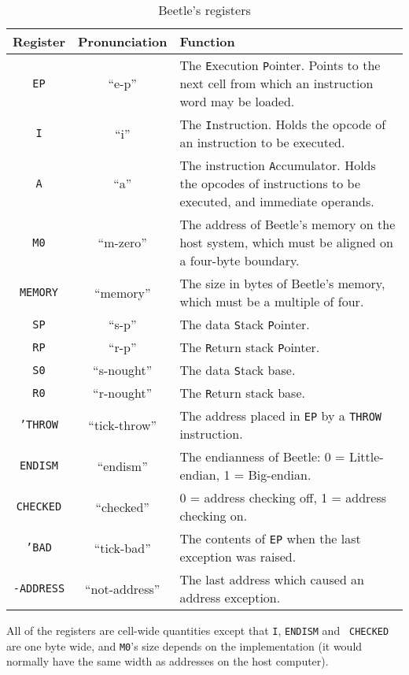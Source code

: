 \documentclass{article}
\begin{document}
\begin{table}[htbp]
\begin{center}
\begin{tabular}{ccp{3.75in}} \toprule
\bf Register & \bf Pronunciation & \bf Function \\
    \midrule
{\tt EP} & ``e-p'' & The {\tt E}xecution {\tt P}ointer. Points to the next
    cell from which an instruction word may be loaded. \\
{\tt I} & ``i'' & The {\tt I}nstruction. Holds the opcode of an instruction
    to be executed. \\
{\tt A} & ``a'' & The instruction {\tt A}ccumulator. Holds the opcodes of
    instructions to be executed, and immediate operands. \\
{\tt M0} & ``m-zero'' & The address of Beetle's memory on the host
    system, which must be aligned on a four-byte boundary. \\
{\tt MEMORY} & ``memory'' & The size in bytes of Beetle's memory,
    which must be a multiple of four. \\
{\tt SP} & ``s-p'' & The data {\tt S}tack {\tt P}ointer. \\
{\tt RP} & ``r-p'' & The {\tt R}eturn stack {\tt P}ointer. \\
{\tt S0} & ``s-nought'' & The data {\tt S}tack base. \\
{\tt R0} & ``r-nought'' & The {\tt R}eturn stack base. \\
{\tt 'THROW} & ``tick-throw'' & The address placed in {\tt EP} by a {\tt THROW}
    instruction. \\
{\tt ENDISM} & ``endism'' & The endianness of Beetle: 0 = Little-endian,
    1 = Big-endian. \\
{\tt CHECKED} & ``checked'' & 0 = address checking off, 1 = address checking
    on. \\
{\tt 'BAD} & ``tick-bad'' & The contents of {\tt EP} when the last exception
    was raised. \\
{\tt -ADDRESS} & ``not-address'' & The last address which caused an address
    exception. \\ \bottomrule
\end{tabular}
\caption{\label{regtable}Beetle's registers}
\end{center}
\end{table}

All of the registers are cell-wide quantities except that {\tt I}, {\tt ENDISM} and {\tt
CHECKED} are one byte wide, and {\tt M0}'s size depends on the implementation (it would normally have the same width as addresses on the host computer).
\end{document}
